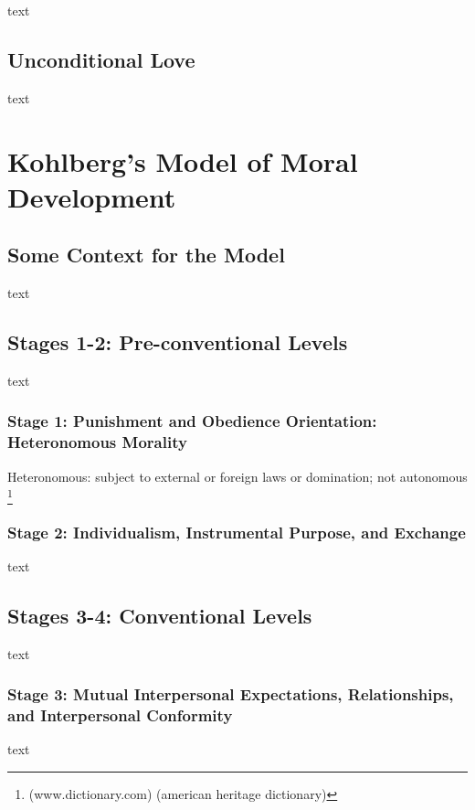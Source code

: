 text

\subsection{Unconditional Love}

text

\section{Kohlberg's Model of Moral Development}\label{sec:Kohl}

\subsection{Some Context for the Model}

text

\subsection{Stages 1-2: Pre-conventional Levels}

text

\subsubsection{Stage 1: Punishment and Obedience Orientation: Heteronomous Morality}

Heteronomous: subject to external or foreign laws or domination; not autonomous \footnote{(www.dictionary.com) (american heritage dictionary)}

\subsubsection{Stage 2: Individualism, Instrumental Purpose, and Exchange}

text

\subsection{Stages 3-4: Conventional Levels}

text

\subsubsection{Stage 3: Mutual Interpersonal Expectations, Relationships, and Interpersonal Conformity}

text

